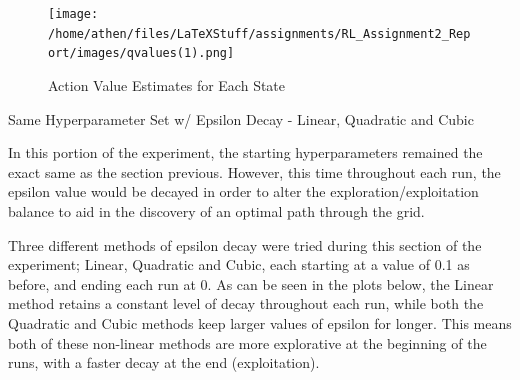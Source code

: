 \documentclass[a4paper,9pt]{scrartcl}
\makeatletter
\renewcommand{\section}{\@startsection{section}{1}{0mm}
  {1.5\baselineskip}
  {1\baselineskip} 
  {\normalfont\Large\bfseries}}
\makeatother
\begin{document}
\begin{figure}[h]
\centering
\texttt{[image: /home/athen/files/LaTeXStuff/assignments/RL\_Assignment2\_Report/images/qvalues(1).png]}
\caption{Action Value Estimates for Each State}
\label{fig:style_transfer_example}
\end{figure}


\section{Same Hyperparameter Set w/ Epsilon Decay - Linear, Quadratic and Cubic}

In this portion of the experiment, the starting hyperparameters remained the exact same as the section previous. However, this time
throughout each run, the epsilon value would be decayed in order to alter the exploration/exploitation balance to aid in the discovery of
an optimal path through the grid.

Three different methods of epsilon decay were tried during this section of the experiment; Linear, Quadratic and Cubic, each starting at a 
value of 0.1 as before, and ending each run at 0. As can be seen in the plots below, the Linear method retains a constant level of decay
throughout each run, while both the Quadratic and Cubic methods keep larger values of epsilon for longer. This means both of these 
non-linear methods are more explorative at the beginning of the runs, with a faster decay at the end (exploitation).
\end{document}
